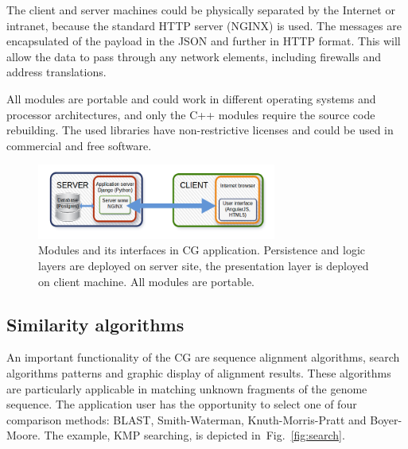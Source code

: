\documentclass[a4paper]{spie}
\newcommand{\appShortcut}{CG}
\begin{document}
The client and server machines could be physically separated by the Internet or intranet,
because the standard HTTP server (NGINX) is used.
The messages are encapsulated of the payload in the JSON and further in HTTP format.
This will allow the data to pass through any network elements, including firewalls and address translations.

All modules are portable and could work in different operating systems and processor architectures, and only the C++ modules require the source code rebuilding.
The used libraries have non-restrictive licenses and could be used in commercial and free software.

\begin{figure}[htp]
  \centering
  \includegraphics[width=0.7\textwidth]{img/ogolny_schemat_en.png}
  \caption{Modules and its interfaces in \appShortcut{} application.
    Persistence and logic layers are deployed on server site, the presentation layer is deployed on client machine.
    All modules are portable.}
  \label{fig:architecture}
\end{figure}

\subsection{Similarity algorithms}

An important functionality of the \appShortcut{} are sequence alignment algorithms, search algorithms patterns and graphic display of alignment results.
These algorithms are particularly  applicable in matching unknown fragments of the genome sequence.
The application user has the opportunity to select one of four comparison methods: BLAST, Smith-Waterman, Knuth-Morris-Pratt and Boyer-Moore.
The example, KMP searching, is depicted in~Fig.~\ref{fig:search}.
\end{document}
